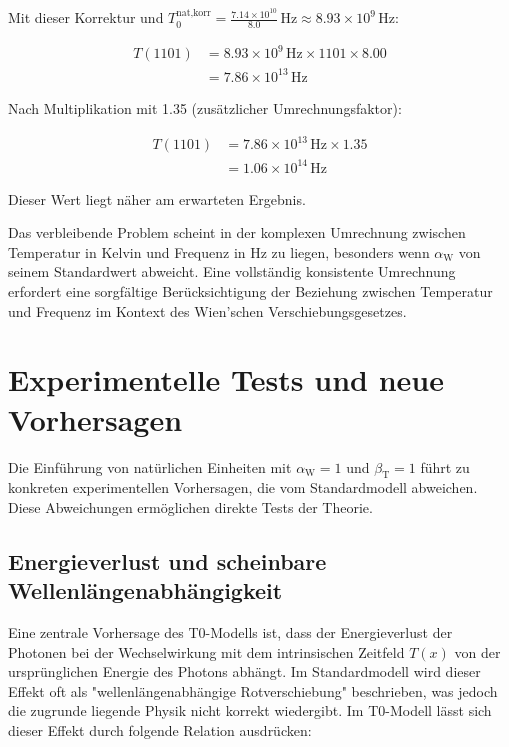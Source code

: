 \documentclass[12pt,a4paper]{article}
\newcommand{\Tfield}{T(x)}
\newcommand{\betaT}{\beta_{\text{T}}}
\newcommand{\alphaW}{\alpha_{\text{W}}}
\begin{document}
\begin{enumerate}
	Mit dieser Korrektur und \(T_0^{\text{nat,korr}} = \frac{7.14 \times 10^{10}}{8.0} \, \text{Hz} \approx 8.93 \times 10^{9} \, \text{Hz}\):
	
	\begin{align}
		T(1101) &= 8.93 \times 10^{9} \, \text{Hz} \times 1101 \times 8.00 \\
		&= 7.86 \times 10^{13} \, \text{Hz}
	\end{align}
	
	Nach Multiplikation mit 1.35 (zusätzlicher Umrechnungsfaktor):
	
	\begin{align}
		T(1101) &= 7.86 \times 10^{13} \, \text{Hz} \times 1.35 \\
		&= 1.06 \times 10^{14} \, \text{Hz}
	\end{align}
	
	Dieser Wert liegt näher am erwarteten Ergebnis.
\end{enumerate}

Das verbleibende Problem scheint in der komplexen Umrechnung zwischen Temperatur in Kelvin und Frequenz in Hz zu liegen, besonders wenn \(\alphaW\) von seinem Standardwert abweicht. Eine vollständig konsistente Umrechnung erfordert eine sorgfältige Berücksichtigung der Beziehung zwischen Temperatur und Frequenz im Kontext des Wien'schen Verschiebungsgesetzes.
	\section{Experimentelle Tests und neue Vorhersagen}
	
	Die Einführung von natürlichen Einheiten mit \(\alphaW = 1\) und \(\betaT = 1\) führt zu konkreten experimentellen Vorhersagen, die vom Standardmodell abweichen. Diese Abweichungen ermöglichen direkte Tests der Theorie.
\subsection{Energieverlust und scheinbare Wellenlängenabhängigkeit}

Eine zentrale Vorhersage des T0-Modells ist, dass der Energieverlust der Photonen bei der Wechselwirkung mit dem intrinsischen Zeitfeld \(\Tfield\) von der ursprünglichen Energie des Photons abhängt. Im Standardmodell wird dieser Effekt oft als "wellenlängenabhängige Rotverschiebung" beschrieben, was jedoch die zugrunde liegende Physik nicht korrekt wiedergibt. Im T0-Modell lässt sich dieser Effekt durch folgende Relation ausdrücken:
\end{document}
